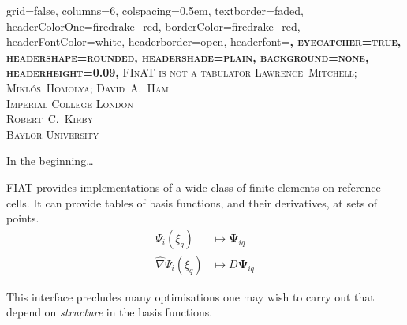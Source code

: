 \documentclass[a0paper,portrait]{baposter}
\begin{document}
\begin{poster}{
    grid=false,
    columns=6,
    colspacing=0.5em,
    textborder=faded,
    headerColorOne=firedrake_red,
    borderColor=firedrake_red,
    headerFontColor=white,
    headerborder=open,
    headerfont=\bfseries\Large\scshape,
    eyecatcher=true,
    headershape=rounded,
    headershade=plain,
    background=none,
    headerheight=0.09\textheight,
  }
  {
  } 
  {\scshape\Large FInAT is not a tabulator}
  {\small\scshape Lawrence~Mitchell; Mikl\'os~Homolya; David~A.~Ham\\[0.1em]Imperial College London
    \\[0.4em]  
    Robert~C.~Kirby\\[0.1em]Baylor University}
  {
  }

  \begin{posterbox}[name=introduction,span=6,column=0,row=0]{In the beginning\dots}
    \begin{multicols}{2}
      {\raggedright FIAT provides implementations of a wide class of
      finite elements on reference cells. It can provide tables of basis
      functions, and their derivatives, at sets of points.
      \begin{align*}
        \Psi_i(\xi_q) &\mapsto \mathbf{\Psi}_{iq}\\
        \hat{\nabla}\Psi_i(\xi_q) &\mapsto D\mathbf{\Psi}_{iq}
      \end{align*}
      \columnbreak
      
      This interface precludes many optimisations one may wish to
      carry out that depend on \emph{structure} in the basis
      functions.

}
\end{multicols}
\end{posterbox}
\end{poster}
\end{document}
